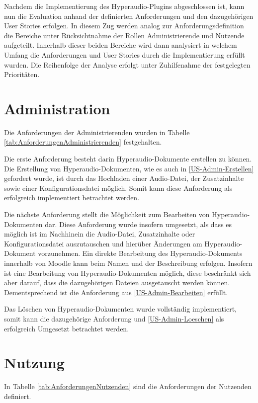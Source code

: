 \label{cap:evaluation}
Nachdem die Implementierung des Hyperaudio-Plugins abgeschlossen ist, kann nun die Evaluation anhand der definierten Anforderungen und den dazugehörigen User Stories erfolgen. In diesem Zug werden analog zur Anforderungsdefinition die Bereiche unter Rücksichtnahme der Rollen Administrierende und Nutzende aufgeteilt. Innerhalb dieser beiden Bereiche wird dann analysiert in welchem Umfang die Anforderungen und User Stories durch die Implementierung erfüllt wurden. Die Reihenfolge der Analyse erfolgt unter Zuhilfenahme der festgelegten Prioritäten.

\section{Administration}
Die Anforderungen der Administrierenden wurden in Tabelle \ref{tab:AnforderungenAdministrierenden} festgehalten.

Die erste Anforderung besteht darin Hyperaudio-Dokumente erstellen zu können. Die Erstellung von Hyperaudio-Dokumenten, wie es auch in \ref{US-Admin-Erstellen} gefordert wurde, ist durch das Hochladen einer Audio-Datei, der Zusatzinhalte sowie einer Konfigurationsdatei möglich. Somit kann diese Anforderung als erfolgreich implementiert betrachtet werden.

Die nächste Anforderung stellt die Möglichkeit zum Bearbeiten von Hyperaudio-Dokumenten dar. Diese Anforderung wurde insofern umgesetzt, als dass es möglich ist im Nachhinein die Audio-Datei, Zusatzinhalte oder Konfigurationsdatei auszutauschen und hierüber Änderungen am Hyperaudio-Dokument vorzunehmen. Ein direkte Bearbeitung des Hyperaudio-Dokuments innerhalb von Moodle kann beim Namen und der Beschreibung erfolgen. Insofern ist eine Bearbeitung von Hyperaudio-Dokumenten möglich, diese beschränkt sich aber darauf, dass die dazugehörigen Dateien ausgetauscht werden können. Dementsprechend ist die Anforderung aus \ref{US-Admin-Bearbeiten} erfüllt.

Das Löschen von Hyperaudio-Dokumenten wurde vollständig implementiert, somit kann die dazugehörige Anforderung und \ref{US-Admin-Loeschen} als erfolgreich Umgesetzt betrachtet werden.

 
\section{Nutzung}
In Tabelle \ref{tab:AnforderungenNutzenden} sind die Anforderungen der Nutzenden definiert.

